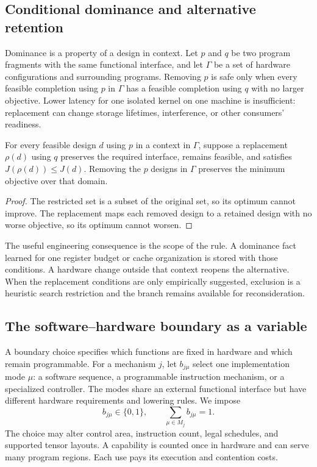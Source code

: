 \subsection{Conditional dominance and alternative retention}
Dominance is a property of a design in context. Let $p$ and $q$ be two program fragments with the same functional interface, and let $\Gamma$ be a set of hardware configurations and surrounding programs. Removing $p$ is safe only when every feasible completion using $p$ in $\Gamma$ has a feasible completion using $q$ with no larger objective. Lower latency for one isolated kernel on one machine is insufficient: replacement can change storage lifetimes, interference, or other consumers' readiness.

\begin{proposition}\label{prop:dominance}
For every feasible design $d$ using $p$ in a context in $\Gamma$, suppose a replacement $\rho(d)$ using $q$ preserves the required interface, remains feasible, and satisfies $J(\rho(d))\le J(d)$. Removing the $p$ designs in $\Gamma$ preserves the minimum objective over that domain.
\end{proposition}
\begin{proof}
The restricted set is a subset of the original set, so its optimum cannot improve. The replacement maps each removed design to a retained design with no worse objective, so its optimum cannot worsen.
\end{proof}

The useful engineering consequence is the scope of the rule. A dominance fact learned for one register budget or cache organization is stored with those conditions. A hardware change outside that context reopens the alternative. When the replacement conditions are only empirically suggested, exclusion is a heuristic search restriction and the branch remains available for reconsideration.

\subsection{The software--hardware boundary as a variable}
A boundary choice specifies which functions are fixed in hardware and which remain programmable. For a mechanism $j$, let $b_{j\mu}$ select one implementation mode $\mu$: a software sequence, a programmable instruction mechanism, or a specialized controller. The modes share an external functional interface but have different hardware requirements and lowering rules. We impose
\begin{equation}
 b_{j\mu}\in\{0,1\},\qquad \sum_{\mu\in M_j}b_{j\mu}=1.\label{eq:boundary}
\end{equation}
The choice may alter control area, instruction count, legal schedules, and supported tensor layouts. A capability is counted once in hardware and can serve many program regions. Each use pays its execution and contention costs.

